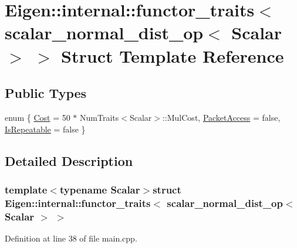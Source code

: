 \hypertarget{struct_eigen_1_1internal_1_1functor__traits_3_01scalar__normal__dist__op_3_01_scalar_01_4_01_4}{\section{Eigen\+:\+:internal\+:\+:functor\+\_\+traits$<$ scalar\+\_\+normal\+\_\+dist\+\_\+op$<$ Scalar $>$ $>$ Struct Template Reference}
\label{struct_eigen_1_1internal_1_1functor__traits_3_01scalar__normal__dist__op_3_01_scalar_01_4_01_4}
}
\subsection*{Public Types}
\begin{DoxyCompactItemize}
\item 
enum \{ \hyperlink{struct_eigen_1_1internal_1_1functor__traits_3_01scalar__normal__dist__op_3_01_scalar_01_4_01_4_aa24d49756a42945135cf4bb233f70852ad22cd8b04dd82075ca39efd3ba99acd6}{Cost} = 50 $\ast$ Num\+Traits$<$Scalar$>$\+:\+:Mul\+Cost, 
\hyperlink{struct_eigen_1_1internal_1_1functor__traits_3_01scalar__normal__dist__op_3_01_scalar_01_4_01_4_aa24d49756a42945135cf4bb233f70852aa50396f958a83c30593e034700290b00}{Packet\+Access} = false, 
\hyperlink{struct_eigen_1_1internal_1_1functor__traits_3_01scalar__normal__dist__op_3_01_scalar_01_4_01_4_aa24d49756a42945135cf4bb233f70852a953ef8c87ba7a342649b4b09347c6fda}{Is\+Repeatable} = false
 \}
\end{DoxyCompactItemize}


\subsection{Detailed Description}
\subsubsection*{template$<$typename Scalar$>$struct Eigen\+::internal\+::functor\+\_\+traits$<$ scalar\+\_\+normal\+\_\+dist\+\_\+op$<$ Scalar $>$ $>$}



Definition at line 38 of file main.\+cpp.



